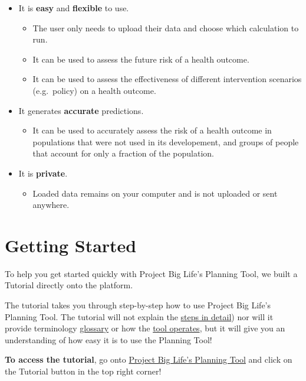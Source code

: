 \documentclass[]{book}
\providecommand{\tightlist}{%
  \setlength{\itemsep}{0pt}\setlength{\parskip}{0pt}}
\begin{document}
\begin{itemize}
\item
  It is \textbf{easy} and \textbf{flexible} to use.

  \begin{itemize}
  \tightlist
  \item
    The user only needs to upload their data and choose which calculation to run.
  \item
    It can be used to assess the future risk of a health outcome.
  \item
    It can be used to assess the effectiveness of different intervention scenarios (e.g.~policy) on a health outcome.
  \end{itemize}
\item
  It generates \textbf{accurate} predictions.

  \begin{itemize}
  \tightlist
  \item
    It can be used to accurately assess the risk of a health outcome in populations that were not used in its developement, and groups of people that account for only a fraction of the population.
  \end{itemize}
\item
  It is \textbf{private}.

  \begin{itemize}
  \tightlist
  \item
    Loaded data remains on your computer and is not uploaded or sent anywhere.
  \end{itemize}
\end{itemize}

\hypertarget{getting-started}{%
\chapter{Getting Started}\label{getting-started}}

To help you get started quickly with Project Big Life's Planning Tool, we built a Tutorial directly onto the platform.

The tutorial takes you through step-by-step how to use Project Big Life's Planning Tool. The tutorial will not explain the \protect\hyperlink{howto}{steps in detail}) nor will it provide terminology \protect\hyperlink{glossary}{glossary} or how the \protect\hyperlink{mport}{tool operates}, but it will give you an understanding of how easy it is to use the Planning Tool!

\textbf{To access the tutorial}, go onto \href{http://planning.projectbiglife.ca/}{Project Big Life's Planning Tool} and click on the Tutorial button in the top right corner!
\end{document}
